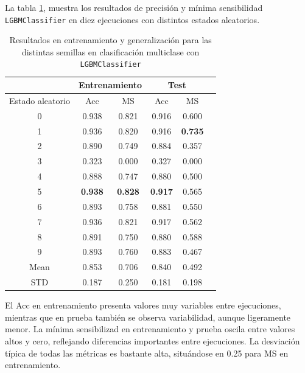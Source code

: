 La tabla \ref{tabla:lgbm_multi}, muestra los resultados de precisión y mínima sensibilidad \texttt{LGBMClassifier} en diez ejecuciones con distintos estados aleatorios.

\begin{table}[H]
	\centering
	\begin{tabular}{ |c|c|c|c|c|c| }
		\hline
		\rowcolor{LightCyan}
		 & \multicolumn{2}{c|}{Entrenamiento} & \multicolumn{2}{c|}{Test} \\
		\hline
		\rowcolor{LightCyan}
		 Estado aleatorio & Acc & MS & Acc & MS \\
		\hline
		0    & 0.938          & 0.821          & 0.916          & 0.600          \\
		1    & 0.936          & 0.820          & 0.916          & \textbf{0.735} \\
		2    & 0.890          & 0.749          & 0.884          & 0.357          \\
		3    & 0.323          & 0.000          & 0.327          & 0.000          \\
		4    & 0.888          & 0.747          & 0.880          & 0.500          \\
		5    & \textbf{0.938} & \textbf{0.828} & \textbf{0.917} & 0.565          \\
		6    & 0.893          & 0.758          & 0.881          & 0.550          \\
		7    & 0.936          & 0.821          & 0.917          & 0.562          \\
		8    & 0.891          & 0.750          & 0.880          & 0.588          \\
		9    & 0.893          & 0.760          & 0.883          & 0.467          \\
		Mean & 0.853          & 0.706          & 0.840          & 0.492          \\
		STD  & 0.187          & 0.250          & 0.181          & 0.198          \\
		\hline
	\end{tabular}
	\caption{Resultados en entrenamiento y generalización para las distintas semillas en clasificación multiclase con \texttt{LGBMClassifier}}
	\label{tabla:lgbm_multi}
\end{table}

El Acc en entrenamiento presenta valores muy variables entre ejecuciones, mientras que en prueba también se observa variabilidad, aunque ligeramente menor. La mínima sensibilizad en entrenamiento y prueba oscila entre valores altos y cero, reflejando diferencias importantes entre ejecuciones. La desviación típica de todas las métricas es bastante alta, situándose en 0.25 para MS en entrenamiento.

